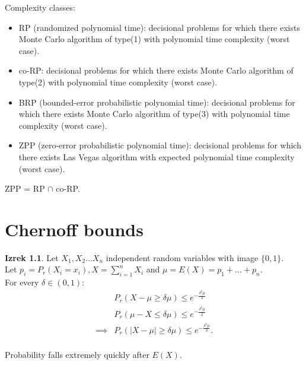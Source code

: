 \documentclass[a4paper, 12pt]{book}
\theoremstyle{definition}
\newtheorem{theorem}[counter]{Izrek}
\theoremstyle{remark}
\begin{document}
Complexity classes:
\begin{itemize}
  \item RP (randomized polynomial time): decisional problems for which there exists Monte Carlo algorithm of type(1)
    with polynomial time complexity (worst case).
  \item co-RP: decisional problems for which there exists Monte Carlo algorithm of type(2) with polynomial time complexity
    (worst case).
  \item BRP (bounded-error probabilistic polynomial time): decisional problems for which there exists Monte Carlo algorithm of type(3)
    with polynomial time complexity (worst case).
  \item ZPP (zero-error probabilistic polynomial time): decisional problems for which there exists Las Vegas algorithm
    with expected polynomial time complexity (worst case).
\end{itemize}
ZPP = RP $\cap$ co-RP.



\chapter{Chernoff bounds}


\begin{theorem}
  Let $X_1, X_2 \dots X_n$ independent random variables with image $\{0, 1\}$. \\
  Let $p_i = P_r(X_i = x_i), X = \sum_{i=1}^{n} X_i$ and $\mu = E(X) = p_1 + \dots + p_n$. \\
  For every $\delta \in (0,1)$:
  \begin{align*}
    &P_r(X - \mu \geq \delta \mu) \leq e^{-\frac{\delta^2 \mu}{3}} \\
    &P_r(\mu - X \leq \delta \mu) \leq e^{-\frac{\delta^2 \mu}{2}} \\
    \implies &P_r(|X - \mu| \geq \delta \mu) \leq e^{-\frac{\delta^2 \mu}{3}}. \\
  \end{align*}
\end{theorem}
Probability falls extremely quickly after $E(X)$.


\end{document}
